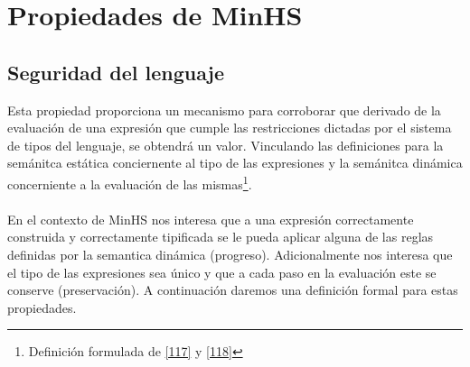 \section{Propiedades de \textsf{MinHS}}

    \subsection{Seguridad del lenguaje}
        Esta propiedad  proporciona un mecanismo para corroborar que derivado de la evaluación de una expresión que cumple las restricciones dictadas por el sistema de tipos del lenguaje, se obtendrá un valor. Vinculando las definiciones para la semánitca estática conciernente al tipo de las expresiones y la semánitca dinámica concerniente a la evaluación de las mismas\footnote{Definición formulada de \hyperlink{117}{[117]} y \hyperlink{118}{[118]}}.\\\\
En el contexto de \textsf{MinHS} nos interesa que a  una expresión correctamente construida y correctamente tipificada se le pueda aplicar alguna de las reglas definidas por la semantica dinámica (progreso). Adicionalmente nos interesa que el tipo de las expresiones sea único y que a cada paso en la evaluación este se conserve (preservación). A continuación daremos una definición formal para estas propiedades.
        
